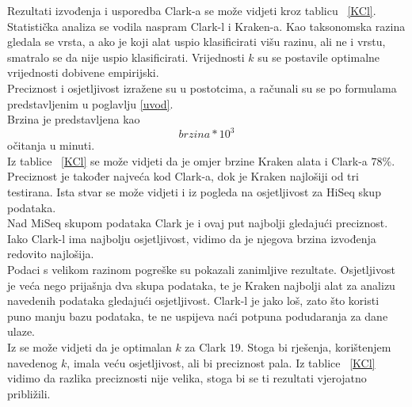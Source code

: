 \documentclass[times, utf8, seminar]{fer}
\begin{document}
Rezultati izvođenja i usporedba Clark-a se može vidjeti kroz tablicu ~\ref{KCl}.
\\Statistička analiza se vodila naspram Clark-l i Kraken-a. Kao taksonomska razina gledala se vrsta, a ako je koji alat uspio klasificirati višu razinu, ali ne i vrstu, smatralo se da nije uspio klasificirati. Vrijednosti $k$ su se postavile optimalne vrijednosti dobivene empirijski.
\\Preciznost i osjetljivost izražene su u postotcima, a računali su se po formulama predstavljenim u poglavlju \ref{uvod}.
\\Brzina je predstavljena kao $$brzina*10^3$$ očitanja u minuti.
\\Iz tablice ~\ref{KCl} se može vidjeti da je omjer brzine Kraken alata i Clark-a $78\%$. Preciznost je također najveća kod Clark-a, dok je Kraken najlošiji od tri testirana. Ista stvar se može vidjeti i iz pogleda na osjetljivost za HiSeq skup podataka.
\\Nad MiSeq skupom podataka Clark je i ovaj put najbolji gledajući preciznost. Iako Clark-l ima najbolju osjetljivost, vidimo da je njegova brzina izvođenja redovito najlošija.
\\Podaci s velikom razinom pogreške su pokazali zanimljive rezultate. Osjetljivost je veća nego prijašnja dva skupa podataka, te je Kraken najbolji alat za analizu navedenih podataka gledajući osjetljivost. Clark-l je jako loš, zato što koristi puno manju bazu podataka, te ne uspijeva naći potpuna podudaranja za dane ulaze. 
\\Iz \cite{CLARK} se može vidjeti da je optimalan $k$ za Clark $19$. Stoga bi rješenja, korištenjem navedenog $k$, imala veću osjetljivost, ali bi preciznost pala. Iz tablice ~\ref{KCl} vidimo da razlika preciznosti nije velika, stoga bi se ti rezultati vjerojatno približili.
\end{document}

